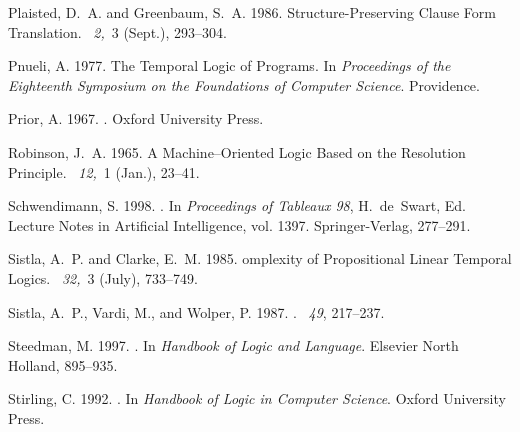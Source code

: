 \documentclass[nohyperref]{acmtrans2f}
\begin{document}
\begin{thebibliography}{}
{\sc Plaisted, D.~A.} {\sc and} {\sc Greenbaum, S.~A.} 1986.
 {S}tructure-{P}reserving {C}lause {F}orm {T}ranslation.
~{\em 2,\/}~3 (Sept.),
  293--304.

{\sc Pnueli, A.} 1977.
\newblock The {T}emporal {L}ogic of {P}rograms.
\newblock In {\em Proceedings of the Eighteenth Symposium on the Foundations of
  Computer Science}. Providence.

{\sc Prior, A.} 1967.
.
\newblock Oxford University Press.

{\sc Robinson, J.~A.} 1965.
\newblock A {M}achine--{O}riented {L}ogic {B}ased on the {R}esolution
  {P}rinciple.
~{\em 12,\/}~1 (Jan.), 23--41.

{\sc Schwendimann, S.} 1998.
.
\newblock In {\em {P}roceedings of Tableaux 98}, {H.~de~Swart}, Ed. Lecture
  Notes in Artificial Intelligence, vol. 1397. Springer-Verlag, 277--291.

{\sc Sistla, A.~P.} {\sc and} {\sc Clarke, E.~M.} 1985.
omplexity of {P}ropositional {L}inear {T}emporal {L}ogics.
~{\em 32,\/}~3 (July), 733--749.

{\sc Sistla, A.~P.}, {\sc Vardi, M.}, {\sc and} {\sc Wolper, P.} 1987.
.
~{\em 49}, 217--237.

{\sc Steedman, M.} 1997.
.
\newblock In {\em {Handbook of Logic and Language}}. Elsevier North Holland,
  895--935.

{\sc Stirling, C.} 1992.
.
\newblock In {\em Handbook of Logic in Computer Science}. Oxford University
  Press.


\end{thebibliography}
\end{document}
